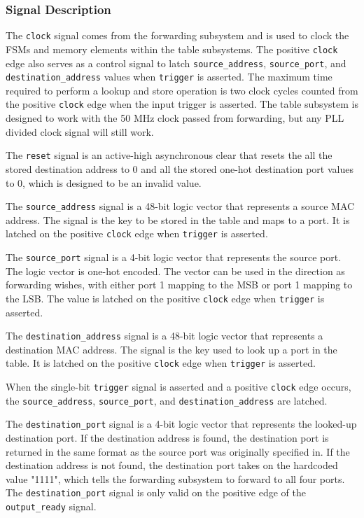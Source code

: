 \documentclass{article}
\begin{document}
\subsubsection{Signal Description}

The \texttt{clock} signal comes from the forwarding subsystem and is used to clock the FSMs and memory elements within the table subsystems. The positive \texttt{clock} edge also serves as a control signal to latch \texttt{source\_address}, \texttt{source\_port}, and \texttt{destination\_address} values when \texttt{trigger} is asserted. The maximum time required to perform a lookup and store operation is two clock cycles counted from the positive \texttt{clock} edge when the input trigger is asserted. The table subsystem is designed to work with the 50 MHz clock passed from forwarding, but any PLL divided clock signal will still work. 

The \texttt{reset} signal is an active-high asynchronous clear that resets the all the stored destination address to 0 and all the stored one-hot destination port values to 0, which is designed to be an invalid value. 

The \texttt{source\_address} signal is a 48-bit logic vector that represents a source MAC address. The signal is the key to be stored in the table and maps to a port. It is latched on the positive \texttt{clock} edge when \texttt{trigger} is asserted.

The \texttt{source\_port} signal is a 4-bit logic vector that represents the source port. The logic vector is one-hot encoded. The vector can be used in the direction as forwarding wishes, with either port 1 mapping to the MSB or port 1 mapping to the LSB. The value is latched on the positive \texttt{clock} edge when \texttt{trigger} is asserted.

The \texttt{destination\_address} signal is a 48-bit logic vector that represents a destination MAC address. The signal is the key used to look up a port in the table. It is latched on the positive \texttt{clock} edge when \texttt{trigger} is asserted.

When the single-bit \texttt{trigger} signal is asserted and a positive \texttt{clock} edge occurs, the \texttt{source\_address}, \texttt{source\_port}, and \texttt{destination\_address} are latched. 

The \texttt{destination\_port} signal is a 4-bit logic vector that represents the looked-up destination port. If the destination address is found, the destination port is returned in the same format as the source port was originally specified in. If the destination address is not found, the destination port takes on the hardcoded value "1111", which tells the forwarding subsystem to forward to all four ports. The \texttt{destination\_port} signal is only valid on the positive edge of the \texttt{output\_ready} signal.
\end{document}
